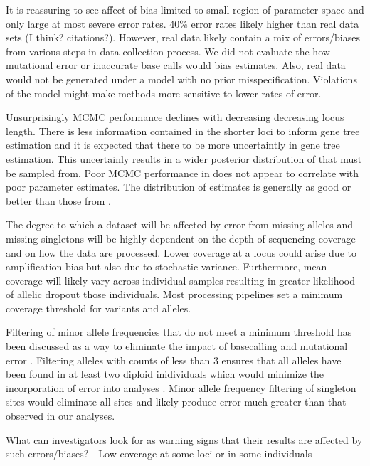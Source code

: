 It is reassuring to see affect of bias limited to small region of parameter 
space and only large at most severe error rates.
40\% error rates likely higher than real data sets (I think? citations?).
However, real data likely contain a mix of errors/biases from
various steps in data collection process. We did not evaluate the how mutational
error or inaccurate base calls would bias estimates.
Also, real data would not be generated under a model with no prior misspecification.
Violations of the model might make methods more sensitive to lower rates of error.

Unsurprisingly MCMC performance declines with decreasing decreasing locus length.
There is less information contained in the shorter loci to inform gene tree estimation 
and it is expected that there to be more uncertaintly in gene tree estimation.
This uncertainly results in a wider posterior distribution of that must be 
sampled from.
Poor MCMC performance in \beast does not appear to correlate with poor parameter 
estimates. The distribution of estimates is generally as good or better than those 
from \ecoevolity. 


The degree to which a dataset will be affected by error from missing alleles 
and missing singletons will be highly dependent on the depth of sequencing coverage
and on how the data are processed. Lower coverage at a locus could arise due 
to amplification bias but also due to stochastic variance. Furthermore,
mean coverage will likely vary across individual samples resulting in greater 
likelihood of allelic dropout those individuals. Most processing pipelines set 
a minimum coverage threshold for variants and alleles. 

Filtering of minor allele frequencies that do not meet a minimum threshold has 
been discussed as a way to eliminate the impact of basecalling and mutational 
error \citep{linckMinorAlleleFrequency2019}.
Filtering alleles with counts of less than 3 ensures that all alleles have been 
found in at least two diploid inidividuals which would minimize the incorporation 
of error into analyses \citep{rochetteStacksAnalyticalMethods2019}.
Minor allele frequency filtering of singleton sites would eliminate all sites 
and likely produce error much greater than that observed in our analyses.



What can investigators look for as warning signs that their results
are affected by such errors/biases?
- Low coverage at some loci or in some individuals

